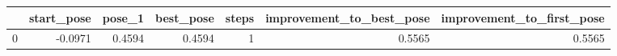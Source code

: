 \begin{tabular}{lrrrrrr}
\toprule
{} &  start\_pose &  pose\_1 &  best\_pose &  steps &  improvement\_to\_best\_pose &  improvement\_to\_first\_pose \\
\midrule
0 &     -0.0971 &  0.4594 &     0.4594 &      1 &                    0.5565 &                     0.5565 \\
\bottomrule
\end{tabular}
